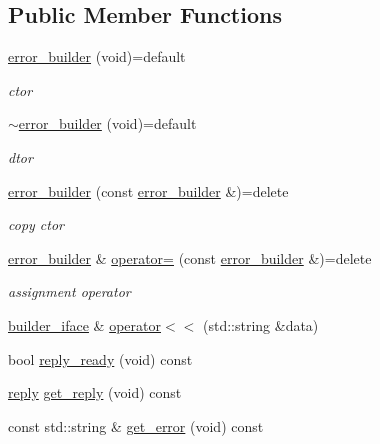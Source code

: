 \subsection*{Public Member Functions}
\begin{DoxyCompactItemize}
\item 
\hyperlink{classcpp__redis_1_1builders_1_1error__builder_abbc5e14b66702ec8b210fb1d288d2423}{error\+\_\+builder} (void)=default
\begin{DoxyCompactList}\small\item\em ctor \end{DoxyCompactList}\item 
\hyperlink{classcpp__redis_1_1builders_1_1error__builder_a7650c178a457c57c2efb19e7ad256fe7}{$\sim$error\+\_\+builder} (void)=default
\begin{DoxyCompactList}\small\item\em dtor \end{DoxyCompactList}\item 
\hyperlink{classcpp__redis_1_1builders_1_1error__builder_a2aee65fdc05abfacda73987e2cf60609}{error\+\_\+builder} (const \hyperlink{classcpp__redis_1_1builders_1_1error__builder}{error\+\_\+builder} \&)=delete
\begin{DoxyCompactList}\small\item\em copy ctor \end{DoxyCompactList}\item 
\hyperlink{classcpp__redis_1_1builders_1_1error__builder}{error\+\_\+builder} \& \hyperlink{classcpp__redis_1_1builders_1_1error__builder_a0b1be51200ff84f17693ee888b03d505}{operator=} (const \hyperlink{classcpp__redis_1_1builders_1_1error__builder}{error\+\_\+builder} \&)=delete
\begin{DoxyCompactList}\small\item\em assignment operator \end{DoxyCompactList}\item 
\hyperlink{classcpp__redis_1_1builders_1_1builder__iface}{builder\+\_\+iface} \& \hyperlink{classcpp__redis_1_1builders_1_1error__builder_af5ac542be148d6f8500de79fa3164798}{operator$<$$<$} (std\+::string \&data)
\item 
bool \hyperlink{classcpp__redis_1_1builders_1_1error__builder_af3d67647f012d0a7378684e2f8258a6d}{reply\+\_\+ready} (void) const
\item 
\hyperlink{classcpp__redis_1_1reply}{reply} \hyperlink{classcpp__redis_1_1builders_1_1error__builder_ae2b68b7daad4d71b6780e47bdcc1e32b}{get\+\_\+reply} (void) const
\item 
const std\+::string \& \hyperlink{classcpp__redis_1_1builders_1_1error__builder_adeef989fb2f5e47e001783cfda48e341}{get\+\_\+error} (void) const
\end{DoxyCompactItemize}
